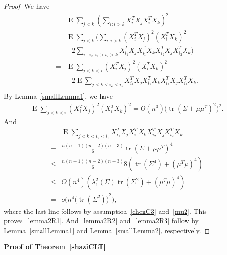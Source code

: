 \documentclass[smallcondensed,final,natbib]{svjour3}          %
\DeclareMathOperator{\mytr}{tr}
\DeclareMathOperator{\myE}{E}
\begin{document}
\begin{proof}
    We have
    \begin{equation*}
    \begin{aligned}
        &\myE\sum_{j<k}{(\sum_{i:i>k}X_i^T X_j X_i^T X_k)}^2\\
        =&
        \myE\sum_{j<k}\Big(\sum_{i:i>k}(X_i^T X_j)^2 (X_i^T X_k)^2\\
        &+2\sum_{i_1,i_2:i_1>i_2>k}X_{i_1}^T X_j X_{i_1}^T X_k X_{i_2}^T X_j X_{i_2}^T X_k\Big)\\
        =&
        \myE\sum_{j<k<i}(X_i^T X_j)^2 (X_i^T X_k)^2\\
        &+2\myE\sum_{j<k<i_2<i_1}X_{i_1}^T X_j X_{i_1}^T X_k X_{i_2}^T X_j X_{i_2}^T X_k.\\
    \end{aligned}
    \end{equation*}
    By Lemma~\ref{smallLemma1}, we have
    \begin{equation*}
    \begin{aligned}
        \myE\sum_{j<k<i}(X_i^T X_j)^2 (X_i^T X_k)^2    =O(n^3)\big(\mytr (\Sigma+\mu\mu^T)^2\big)^2.
    \end{aligned}
    \end{equation*}
And
    \begin{equation*}
    \begin{aligned}
        &\myE\sum_{j<k<i_2<i_1}X_{i_1}^T X_j X_{i_1}^T X_k X_{i_2}^T X_j X_{i_2}^T X_k\\
        =&\frac{n(n-1)(n-2)(n-3)}{6}\mytr {(\Sigma+\mu\mu^T)}^4\\
        \leq& \frac{n(n-1)(n-2)(n-3)}{6}8(\mytr (\Sigma^4)+(\mu^T \mu)^4)\\
        \leq& O(n^4)(\lambda_{1}^2(\Sigma)\mytr (\Sigma^2)+(\mu^T \mu)^4)\\
        =&
        o\Big(n^4{\big(\mytr (\Sigma^2)\big)}^2\Big),
    \end{aligned}
    \end{equation*}
    where the last line follows by assumption~\eqref{chenC3} and~\eqref{mu2}.
    This proves~\eqref{lemma2R1}. And~\eqref{lemma2R2} and~\eqref{lemma2R3} follow by Lemma~\ref{smallLemma1} and Lemma~\ref{smallLemma2}, respectively.

\end{proof}

\textbf{Proof of Theorem~\ref{shaziCLT}}
\end{document}
